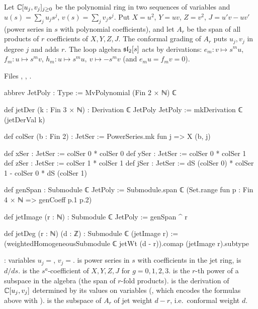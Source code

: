\begin{definition}\label{l28:def:jet}
Let ${\mathbb{C}}[u_j,v_j]_{j\ge0}$ be the polynomial ring in two sequences of variables and $u(s)=\sum_ju_js^j$, $v(s)=\sum_jv_js^j$. Put
$X=u^2$, $Y=uv$, $Z=v^2$, $J=u'v-uv'$ (power series in $s$ with polynomial coefficients), and let $A_r$ be the span of all products of $r$ coefficients
of $X,Y,Z,J$. The conformal grading of $A_r$ puts $u_j,v_j$ in degree $j$ and adds $r$. The loop algebra $\mathfrak{sl}_2[s]$ acts by derivations:
$e_m\colon v\mapsto s^mu$, $f_m\colon u\mapsto s^mv$, $h_m\colon u\mapsto s^mu,\ v\mapsto-s^mv$ (and $e_mu=f_mv=0$).
\end{definition}

\noindent Files , ,
.
\begin{leancode}
abbrev JetPoly : Type := MvPolynomial (Fin 2 × ℕ) ℂ

def jetDer (k : Fin 3 × ℕ) : Derivation ℂ JetPoly JetPoly := mkDerivation ℂ (jetDerVal k)

def colSer (b : Fin 2) : JetSer := PowerSeries.mk fun j => X (b, j)

def xSer : JetSer := colSer 0 * colSer 0
def ySer : JetSer := colSer 0 * colSer 1
def zSer : JetSer := colSer 1 * colSer 1
def jSer : JetSer := dS (colSer 0) * colSer 1 - colSer 0 * dS (colSer 1)

def genSpan : Submodule ℂ JetPoly :=
  Submodule.span ℂ (Set.range fun p : Fin 4 × ℕ => genCoeff p.1 p.2)

def jetImage (r : ℕ) : Submodule ℂ JetPoly := genSpan ^ r

def jetDeg (r : ℕ) (d : ℤ) : Submodule ℂ (jetImage r) :=
  (weightedHomogeneousSubmodule ℂ jetWt (d - r)).comap (jetImage r).subtype

\end{leancode}

\begin{dictionary}
: variables $u_j=$, $v_j=$.  is power series in $s$ with coefficients in
the jet ring,  is $d/ds$.  is the $s^a$-coefficient of $X,Y,Z,J$ for $g=0,1,2,3$.  is the $r$-th power
of a subspace in the algebra (the span of $r$-fold products).  is the derivation of ${\mathbb{C}}[u_j,v_j]$ determined by its values on
variables (, which encodes the formulas above with ).  is the subspace of $A_r$ of jet weight
$d-r$, i.e.\ conformal weight $d$.
\end{dictionary}

